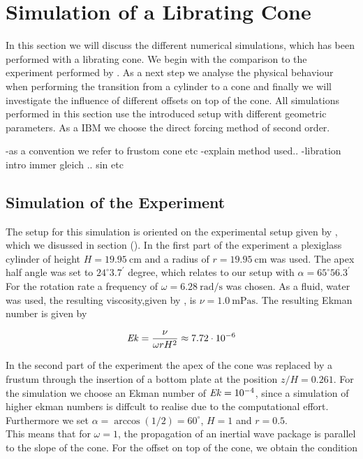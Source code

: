 \newpage

\section{Simulation of a Librating Cone}

In this section we will discuss the different numerical simulations, which has been performed
with a librating cone. We begin with the comparison to the experiment performed by \citep{Beardsley1970}.
As a next step we analyse the physical behaviour when performing the transition from a cylinder
to a cone and finally  we will investigate the influence of different offsets on top of the cone.
All simulations performed in this section use the introduced setup with different geometric parameters.
As a IBM we choose the direct forcing  method of second order.

-as a convention we refer to frustom cone etc
-explain method used..
-libration intro immer gleich .. sin etc

\subsection{Simulation of the Experiment}

The setup for this simulation is oriented on the experimental setup given by \citep{Beardsley1970}, which
we disussed in section ().
In the first part of the experiment a plexiglass cylinder of height $H=\SI{19.95}{\centi\meter}$ and a radius of
$r=\SI{19.95}{\centi\meter}$ was used. The apex half angle was set to $24^{\circ}3.7^{\prime}$ degree,
which relates to our setup with $\alpha=65^{\circ}56.3^{\prime}$
For the rotation rate a frequency of $\omega =\SI{6.28}{\radian\per\second}$ was chosen.
As a fluid, water was used, the resulting viscosity,given by \citep{tipler2003}, is $\nu = \SI{1.0}{\milli\pascal\second}$.
The resulting Ekman number is given by

\begin{align}
    \mbox{\textit{Ek}} = \frac{\nu}{\omega r H^2} \approx 7.72\cdot 10^{-6}
\end{align}

In the second part of the experiment the apex of the cone was replaced by a frustum through the
insertion of a bottom plate at the position $z/H = 0.261$.
For the simulation we choose an Ekman number of $\mbox{\textit{Ek}} =  10^{-4}$, since a simulation of higher ekman numbers is
diffcult to realise due to the computational effort.
Furthermore we set $\alpha = \arccos(1/2) = 60^{\circ}$, $H=1$ and $r=0.5$.\\
This means that for $\omega=1$, the propagation of an inertial wave package is parallel to the slope of the cone.
For the offset on top of the cone, we obtain the condition

